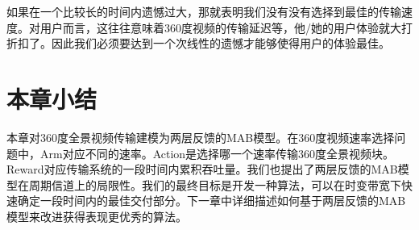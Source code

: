 如果在一个比较长的时间内遗憾过大，那就表明我们没有没有选择到最佳的传输速度。对用户而言，这往往意味着360度视频的传输延迟等，他/她的用户体验就大打折扣了。因此我们必须要达到一个次线性的遗憾才能够使得用户的体验最佳。
\section{本章小结}

本章对360度全景视频传输建模为两层反馈的MAB模型。在360度视频速率选择问题中，Arm对应不同的速率。Action是选择哪一个速率传输360度全景视频块。Reward对应传输系统的一段时间内累积吞吐量。我们也提出了两层反馈的MAB模型在周期信道上的局限性。我们的最终目标是开发一种算法，可以在时变带宽下快速确定一段时间内的最佳交付部分。下一章中详细描述如何基于两层反馈的MAB模型来改进获得表现更优秀的算法。

